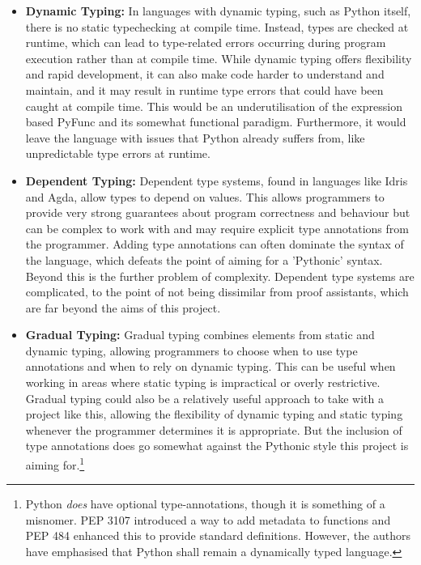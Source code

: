 \documentclass{l4proj}
\begin{document}
\begin{itemize}
    \item \textbf{Dynamic Typing:} In languages with dynamic typing, such as Python itself, there is no static typechecking at compile time.
    Instead, types are checked at runtime, which can lead to type-related errors occurring during program execution rather than at compile time. 
    While dynamic typing offers flexibility and rapid development, it can also make code harder to understand and maintain, and it may result in runtime type errors that could have been caught at compile time.
    This would be an underutilisation of the expression based PyFunc and its somewhat functional paradigm.
    Furthermore, it would leave the language with issues that Python already suffers from, like unpredictable type errors at runtime.
    \item \textbf{Dependent Typing:} Dependent type systems, found in languages like Idris and Agda, allow types to depend on values.
    This allows programmers to provide very strong guarantees about program correctness and behaviour but can be complex to work with and may require explicit type annotations from the programmer.
    Adding type annotations can often dominate the syntax of the language, which defeats the point of aiming for a 'Pythonic' syntax.
    Beyond this is the further problem of complexity.
    Dependent type systems are complicated, to the point of not being dissimilar from proof assistants, which are far beyond the aims of this project.
    \item \textbf{Gradual Typing:} Gradual typing combines elements from static and dynamic typing, allowing programmers to choose when to use type annotations and when to rely on dynamic typing.
    This can be useful when working in areas where static typing is impractical or overly restrictive. 
    Gradual typing could also be a relatively useful approach to take with a project like this, allowing the flexibility of dynamic typing and static typing whenever the programmer determines it is appropriate.
    But the inclusion of type annotations does go somewhat against the Pythonic style this project is aiming for.\footnote{Python \emph{does} have optional type-annotations, though it is something of a misnomer.
    PEP 3107 introduced a way to add metadata to functions and PEP 484 enhanced this to provide standard definitions.
    However, the authors have emphasised that Python shall remain a dynamically typed language.}
\end{itemize}
\end{document}
